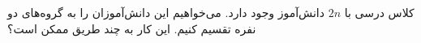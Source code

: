 کلاس درسی با
$2n$
دانش‌آموز وجود دارد.
می‌خواهیم این دانش‌آموزان را به گروه‌های دو نفره تقسیم کنیم.
این کار به چند طریق ممکن است؟